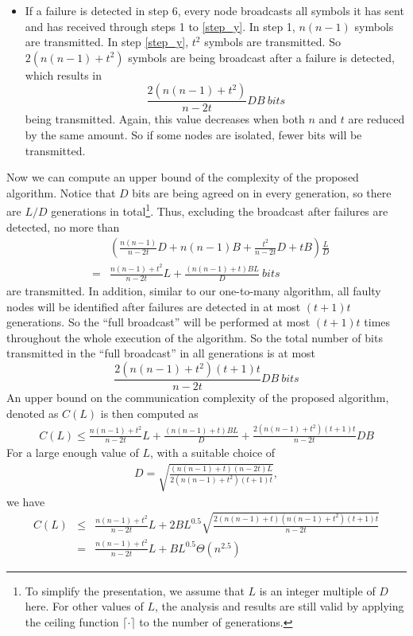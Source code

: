 \documentclass[12pt]{article}
\begin{document}
\begin{itemize}
\item If a failure is detected in step 6, every node broadcasts all symbols it has sent and has received through steps 1 to \ref{step_y}. In step 1, $n(n-1)$ symbols are transmitted. In step \ref{step_y}, $t^2$ symbols are transmitted. So $2(n(n-1)+t^2)$ symbols are being broadcast after a failure is detected, which results in 
\begin{equation}
\frac{2(n(n-1)+t^2)}{n-2t}DB~bits
\end{equation}
being transmitted.  Again, this value decreases when both $n$ and $t$ are reduced by the same amount. So if some nodes are isolated, fewer bits will be transmitted.
\end{itemize}

Now we can compute an upper bound of the complexity of the proposed algorithm. Notice that $D$ bits are being agreed on in every generation, so there are $L/D$ generations in total\footnote{To simplify the presentation, we assume that $L$ is an integer multiple of $D$ here. For other values of $L$, the analysis and results are still valid by applying the ceiling function $\lceil\cdot\rceil$ to the number of generations.}. Thus, excluding the broadcast after failures are detected, no more than
\begin{eqnarray}
&&\left(\frac{n(n-1)}{n-2t}D + n(n-1)B + \frac{t^2}{n-2t}D + tB\right)\frac{L}{D}\\
&=& \frac{n(n-1)+t^2}{n-2t}L + \frac{(n(n-1)+t)BL}{D}~bits
\end{eqnarray}
are transmitted. In addition, similar to our one-to-many algorithm, all faulty nodes will be identified after failures are detected in at most $(t+1)t$ generations. So the ``full broadcast'' will be performed at most $(t+1)t$ times throughout the whole execution of the algorithm. So the total number of bits transmitted in the ``full broadcast'' in all generations is at most 
\begin{equation}
\frac{2(n(n-1)+t^2)(t+1)t}{n-2t}DB~bits
\end{equation}
An upper bound on the communication complexity of the proposed algorithm, denoted as $C(L)$ is then computed as
\begin{eqnarray}
C(L) \le \frac{n(n-1)+t^2}{n-2t}L + \frac{(n(n-1)+t)BL}{D} + \frac{2(n(n-1)+t^2)(t+1)t}{n-2t}DB
\end{eqnarray}
For a large enough value of $L$, with a suitable choice of 
\begin{eqnarray}
D = \sqrt{\frac{(n(n-1)+t)(n-2t)L}{2(n(n-1)+t^2)(t+1)t}},
\end{eqnarray}
we have
\begin{eqnarray}
C(L) &\le& \frac{n(n-1)+t^2}{n-2t}L + 2BL^{0.5}\sqrt{\frac{2(n(n-1)+t)(n(n-1)+t^2)(t+1)t}{n-2t}}\\
&=& \frac{n(n-1)+t^2}{n-2t}L + BL^{0.5}\Theta(n^{2.5})
\end{eqnarray}
\end{document}
